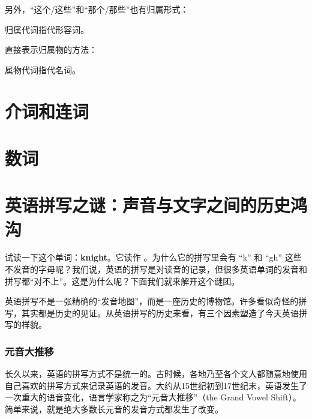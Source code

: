 \documentclass[10.5pt, a4paper]{ctexbook} %
\begin{document}
另外，“这个/这些”和“那个/那些”也有归属形式：

\begin{liju}
\end{liju}

归属代词指代形容词。

直接表示归属物的方法：

\begin{liju}
\end{liju}

属物代词指代名词。

\section{介词和连词}

\section{数词}

\section{英语拼写之谜：声音与文字之间的历史鸿沟}

试读一下这个单词：\textbf{knight}。它读作 。为什么它的拼写里会有 “k” 和 “gh” 这些不发音的字母呢？我们说，英语的拼写是对读音的记录，但很多英语单词的发音和拼写都“对不上”。这是为什么呢？下面我们就来解开这个谜团。

英语拼写不是一张精确的“发音地图”，而是一座历史的博物馆。许多看似奇怪的拼写，其实都是历史的见证。从英语拼写的历史来看，有三个因素塑造了今天英语拼写的样貌。

\subsubsection*{元音大推移}

长久以来，英语的拼写方式不是统一的。古时候，各地乃至各个文人都随意地使用自己喜欢的拼写方式来记录英语的发音。大约从15世纪初到17世纪末，英语发生了一次重大的语音变化，语言学家称之为“元音大推移”（the Grand Vowel Shift）。简单来说，就是绝大多数长元音的发音方式都发生了改变。
\end{document}
